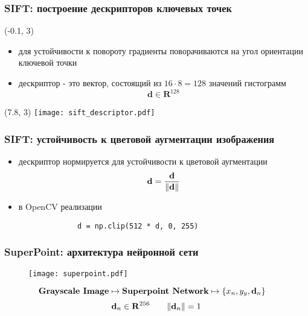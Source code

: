 \documentclass[12pt, usepdftitle=false, aspectratio=1610]{beamer}
\DeclarePairedDelimiter{\norm}{\lVert}{\rVert}
\begin{document}
\begin{frame}
\frametitle{SIFT: построение дескрипторов ключевых точек}
\begin{textblock}{8}(-0.1, 3)
    \begin{itemize}
        \item для устойчивости к повороту градиенты поворачиваются на угол ориентации ключевой точки
        \item дескриптор - это вектор, состоящий из  $16\cdot8=128$  значений гистограмм
        $$
            \mathbf{d}\in\mathbf{R}^{128}
        $$
    \end{itemize}
\end{textblock}
\begin{textblock}{5}(7.8, 3)
    \texttt{[image: sift\_descriptor.pdf]}
\end{textblock}
\end{frame}

\begin{frame}[fragile]
\frametitle{SIFT: устойчивость к цветовой аугментации изображения}
\begin{itemize}
\item дескриптор нормируется для устойчивости к  цветовой аугментации
 $$
    \mathbf{d}=\frac{\mathbf{d}}{\norm{\mathbf{d}}}
$$
\item в OpenCV реализации
\vspace*{0.4cm}

\begin{figure}[h!]
    \centering
    \begin{verbatim}
        d = np.clip(512 * d, 0, 255)
    \end{verbatim}
\end{figure}
\end{itemize}
\end{frame}

\begin{frame}
\frametitle{SuperPoint: архитектура нейронной сети}
\begin{figure}
    \texttt{[image: superpoint.pdf]}
\end{figure}
$$
    \mbox{\textbf{Grayscale Image}}
    \mapsto
    \mbox{\textbf{Superpoint Network}}
    \mapsto
    \left\{x_n, y_y, \mathbf{d}_n\right\}
    \quad
$$
$$
    \mathbf{d}_n\in\mathbf{R}^{256}\qquad
    \norm{\mathbf{d}_n}=1
$$
\end{frame}
\end{document}
